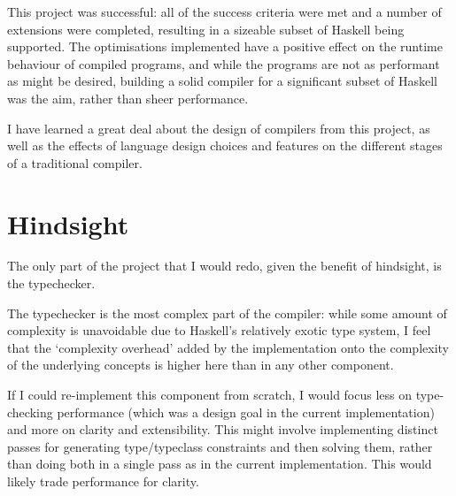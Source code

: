 \documentclass[dissertation.tex]{subfiles}
\begin{document}
This project was successful: all of the success criteria were met and a number of extensions were completed, resulting in a sizeable subset of Haskell being supported. The optimisations implemented have a positive effect on the runtime behaviour of compiled programs, and while the programs are not as performant as might be desired, building a solid compiler for a significant subset of Haskell was the aim, rather than sheer performance.

I have learned a great deal about the design of compilers from this project, as well as the effects of language design choices and features on the different stages of a traditional compiler.

\section{Hindsight}
{
    The only part of the project that I would redo, given the benefit of hindsight, is the typechecker.

    The typechecker is the most complex part of the compiler: while some amount of complexity is unavoidable due to Haskell's relatively exotic type system, I feel that the `complexity overhead' added by the implementation onto the complexity of the underlying concepts is higher here than in any other component.

    If I could re-implement this component from scratch, I would focus less on type-checking performance (which was a design goal in the current implementation) and more on clarity and extensibility. This might involve implementing distinct passes for generating type/typeclass constraints and then solving them, rather than doing both in a single pass as in the current implementation. This would likely trade performance for clarity. 
}
\end{document}
